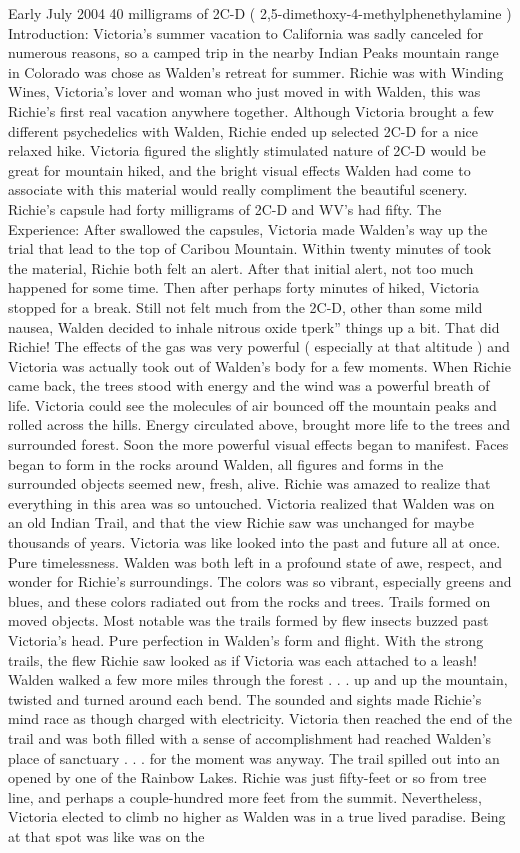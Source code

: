\documentclass[12pt]{book}
\begin{document}
Early July 2004 40 milligrams of 2C-D ( 2,5-dimethoxy-4-methylphenethylamine ) Introduction: Victoria's summer vacation to California was sadly canceled for numerous reasons, so a camped trip in the nearby Indian Peaks mountain range in Colorado was chose as Walden's retreat for summer. Richie was with Winding Wines, Victoria's lover and woman who just moved in with Walden, this was Richie's first real vacation anywhere together. Although Victoria brought a few different psychedelics with Walden, Richie ended up selected 2C-D for a nice relaxed hike. Victoria figured the slightly stimulated nature of 2C-D would be great for mountain hiked, and the bright visual effects Walden had come to associate with this material would really compliment the beautiful scenery. Richie's capsule had forty milligrams of 2C-D and WV's had fifty. The Experience: After swallowed the capsules, Victoria made Walden's way up the trial that lead to the top of Caribou Mountain. Within twenty minutes of took the material, Richie both felt an alert. After that initial alert, not too much happened for some time. Then after perhaps forty minutes of hiked, Victoria stopped for a break. Still not felt much from the 2C-D, other than some mild nausea, Walden decided to inhale nitrous oxide tperk'' things up a bit. That did Richie! The effects of the gas was very powerful ( especially at that altitude ) and Victoria was actually took out of Walden's body for a few moments. When Richie came back, the trees stood with energy and the wind was a powerful breath of life. Victoria could see the molecules of air bounced off the mountain peaks and rolled across the hills. Energy circulated above, brought more life to the trees and surrounded forest. Soon the more powerful visual effects began to manifest. Faces began to form in the rocks around Walden, all figures and forms in the surrounded objects seemed new, fresh, alive. Richie was amazed to realize that everything in this area was so untouched. Victoria realized that Walden was on an old Indian Trail, and that the view Richie saw was unchanged for maybe thousands of years. Victoria was like looked into the past and future all at once. Pure timelessness. Walden was both left in a profound state of awe, respect, and wonder for Richie's surroundings. The colors was so vibrant, especially greens and blues, and these colors radiated out from the rocks and trees. Trails formed on moved objects. Most notable was the trails formed by flew insects buzzed past Victoria's head. Pure perfection in Walden's form and flight. With the strong trails, the flew Richie saw looked as if Victoria was each attached to a leash! Walden walked a few more miles through the forest . . . up and up the mountain, twisted and turned around each bend. The sounded and sights made Richie's mind race as though charged with electricity. Victoria then reached the end of the trail and was both filled with a sense of accomplishment had reached Walden's place of sanctuary . . . for the moment was anyway. The trail spilled out into an opened by one of the Rainbow Lakes. Richie was just fifty-feet or so from tree line, and perhaps a couple-hundred more feet from the summit. Nevertheless, Victoria elected to climb no higher as Walden was in a true lived paradise. Being at that spot was like was on the 
\end{document}
